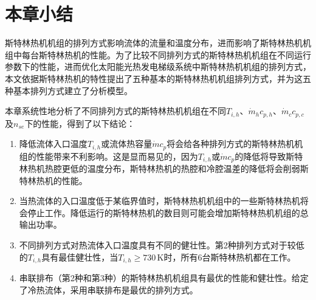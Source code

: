 \section{本章小结}

斯特林热机机组的排列方式影响流体的流量和温度分布，进而影响了斯特林热机机组中每台斯特林热机的性能。为了比较不同排列方式的斯特林热机机组在不同运行参数下的性能，进而优化太阳能光热发电梯级系统中斯特林热机机组的排列方式，本文依据斯特林热机的特性提出了五种基本的斯特林热机机组排列方式，并为这五种基本排列方式建立了分析模型。

本章系统性地分析了不同排列方式的斯特林热机机组在不同$T_{i,h}$、$\dot{m}_hc_{p,h}$、$\dot{m}_cc_{p,c}$及$n_{se}$下的性能，得到了以下结论：

\begin{enumerate}[label=(\arabic*)]
	\item 降低流体入口温度$T_{i,h}$或流体热容量$\dot{m}c_{p}$将会给各种排列方式的斯特林热机机组的性能带来不利影响。这是显而易见的，因为$T_{i,h}$或$\dot{m}c_p$的降低将导致斯特林热机热腔更低的温度分布，斯特林热机的热腔和冷腔温差的降低将会削弱斯特林热机的性能。
	\item 当热流体的入口温度低于某临界值时，斯特林热机机组中的一些斯特林热机将会停止工作。降低运行的斯特林热机的数目则可能会增加斯特林热机机组的总输出功率。
	\item 不同排列方式对热流体入口温度具有不同的健壮性。第2种排列方式对于较低的$T_{i,h}$具有最佳健壮性，当$T_{i,h} \geqslant 730\,\mathrm{K}$时，所有6台斯特林热机都在工作。
	\item 串联排布（第2种和第3种）的斯特林热机机组具有最优的性能和健壮性。给定了冷热流体，采用串联排布是最优的排列方式。
\end{enumerate}